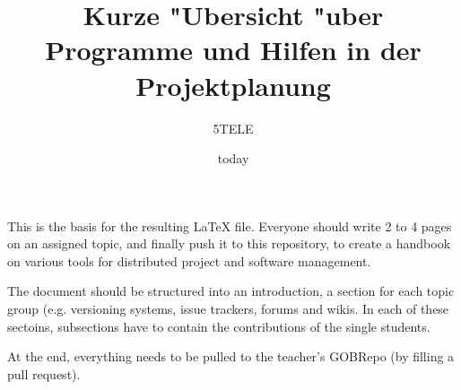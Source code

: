 \documentclass[a4paper]{article}
\begin{document}
\title{Kurze "Ubersicht "uber Programme und Hilfen in der Projektplanung}
\author{5TELE}
\date{today}

\maketitle














    This is the basis for the resulting LaTeX file.
    Everyone should write 2 to 4 pages on an assigned topic, and finally push it to this repository, to create a handbook on various tools
    for distributed project and software management.
    
    The document should be structured into an introduction, a section for each topic group (e.g. versioning systems, issue trackers, forums and wikis.
    In each of these sectoins, subsections have to contain the contributions of the single students.

    At the end, everything needs to be pulled to the teacher's GOBRepo (by filling a pull request).
\end{document}
